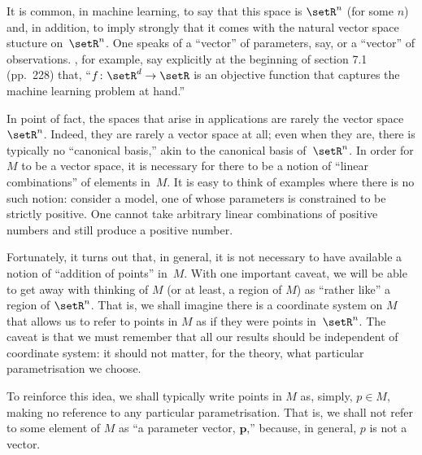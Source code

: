 \documentclass[10pt, a4paper]{article}
\begin{document}
It is common, in machine learning, to say that this space is $\setR^n$
(for some $n$) and, in addition, to imply strongly that it comes with
the natural vector space stucture on~$\setR^n$. One speaks of a
``vector'' of parameters, say, or a ``vector'' of
observations. \textcite{deisenroth2020mathematics}, for example, say
explicitly at the beginning of section 7.1 (pp.~228) that,
``$f\colon\setR^d\to\setR$ is an objective function that captures the
machine learning problem at hand.''

In point of fact, the spaces that arise in applications are rarely the
vector space $\setR^n$. Indeed, they are rarely a vector space at all;
even when they are, there is typically no ``canonical basis,'' akin to
the canonical basis of~$\setR^n$. In order for $M$ to be a vector
space, it is necessary for there to be a notion of ``linear
combinations'' of elements in~$M$. It is easy to think of examples
where there is no such notion: consider a model, one of whose
parameters is constrained to be strictly positive. One cannot take
arbitrary linear combinations of positive numbers and still produce a
positive number.

Fortunately, it turns out that, in general, it is not necessary to
have available a notion of ``addition of points'' in~$M$. With one
important caveat, we will be able to get away with thinking of $M$ (or
at least, a region of $M$) as ``rather like'' a region of
$\setR^n$. That is, we shall imagine there is a coordinate system on
$M$ that allows us to refer to points in $M$ as if they were points
in~$\setR^n$. The caveat is that we must remember that all our results
should be independent of coordinate system: it should not matter, for
the theory, what particular parametrisation we choose.

To reinforce this idea, we shall typically write points in $M$ as,
simply, $p\in M$, making no reference to any particular
parametrisation. That is, we shall not refer to some element of $M$ as
``a parameter vector, $\mathbold{p}$,'' because, in general, $p$ is not a
vector.
\end{document}

